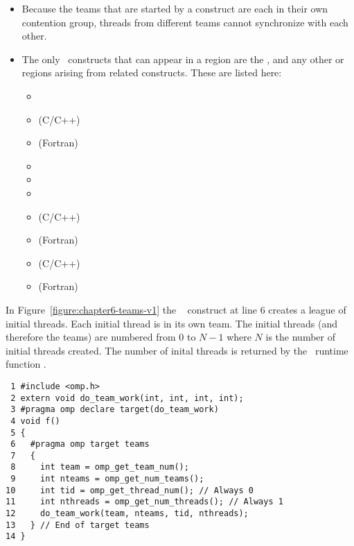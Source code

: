 \begin{itemize}

  \item Because the teams that are started by a 
  construct are each in their own contention group, threads from different 
  teams cannot synchronize with each other.

  \item The only \OMP\ constructs that can appear in a  region
  are the ,  and any other  or
   regions arising from related constructs.  These are
  listed here: \begin{itemize}
      \item {} 
      \item {} (C/C++)
      \item {} (Fortran)
      \item {}
      \item {} 
      \item {}
      \item {} (C/C++)
      \item {} (Fortran)
      \item {} (C/C++)
      \item {} (Fortran)
  \end{itemize}

\end{itemize}

In Figure~\ref{figure:chapter6-teams-v1} the ~ construct
at line $6$ creates a league of initial threads.  Each initial thread is in its own team.
The initial threads (and therefore the teams) are numbered from $0$ to $N-1$ where
$N$ is the number of initial threads created.  The number of inital threads
is returned by the \OMP\ runtime function .

\begin{figure*}[!tb]
\begin{verbatim}
 1 #include <omp.h>
 2 extern void do_team_work(int, int, int, int);
 3 #pragma omp declare target(do_team_work)
 4 void f()
 5 {
 6   #pragma omp target teams
 7   {
 8     int team = omp_get_team_num();
 9     int nteams = omp_get_num_teams();
10     int tid = omp_get_thread_num(); // Always 0
11     int nthreads = omp_get_num_threads(); // Always 1
12     do_team_work(team, nteams, tid, nthreads);
13   } // End of target teams
14 }
\end{verbatim}
\caption{ \textbf {Example of the target teams construct } -- \small
          Multiple initial threads execute the function \texttt{do\_team\_work()}.     
         }
\label{figure:chapter6-teams-v1}
\end{figure*}

